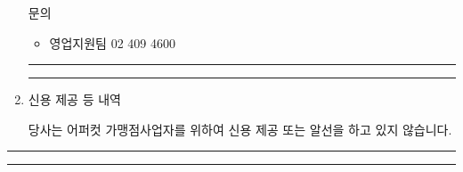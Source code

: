 \documentclass[a5paper,10pt]{oblivoir}
\newcommand\crule[3][black]{\textcolor{#1}{\rule{#2}{#3}}}
\begin{document}
\begin{enumerate}
\begin{tiny}
\begin{Form}
\noindent\dotfill 
 문의

\begin{itemize}
\item 영업지원팀 02 409 4600
\end{itemize}

\end{Form}
\end{tiny}

\newpage
\begin{center}
\crule[red]{4cm}{0.1cm} \crule[blue]{4cm}{0.1cm}
\end{center}

\item 신용 제공 등 내역

 당사는 어퍼컷 가맹점사업자를 위하여 신용 제공 또는 알선을 하고 있지 않습니다.
\end{enumerate}

\newpage
\begin{center}
\crule[red]{4cm}{0.1cm} \crule[blue]{4cm}{0.1cm}
\end{center}
\end{document}
